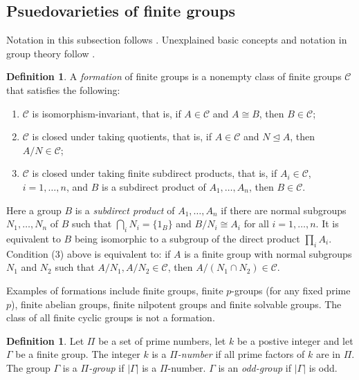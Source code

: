 \documentclass[10pt,a4paper]{amsart}
\theoremstyle{definition}
\newtheorem{definition}[theorem]{Definition}
\theoremstyle{definition}
\numberwithin{equation}{section}
\begin{document}
\subsection{Psuedovarieties of finite groups}
Notation in this subsection follows \cite{RZBook}. Unexplained basic concepts and notation in group theory follow \cite{RobinsonBook}.

\begin{definition}\label{def:formation} A {\em formation} of finite groups is a nonempty class of finite groups $\mathcal{C}$ that satisfies the following:
\begin{enumerate}
\item[(1)] $\mathcal{C}$ is isomorphism-invariant, that is, if $A\in \mathcal{C}$ and $A\cong B$, then $B\in\mathcal{C}$;
\item[(2)] $\mathcal{C}$ is closed under taking quotients, that is, if $A\in\mathcal{C}$ and $N\unlhd A$, then $A/N\in\mathcal{C}$;
\item[(3)] $\mathcal{C}$ is closed under taking finite subdirect products, that is, if $A_i\in \mathcal{C}$, $i=1,\dots, n$, and $B$ is a subdirect product of $A_1,\dots, A_n$, then $B\in \mathcal{C}$.
\end{enumerate}
\end{definition}

Here a group $B$ is a {\em subdirect product} of $A_1, \dots, A_n$ if there are normal subgroups $N_1,\dots, N_n$ of $B$ such that $\bigcap_i N_i=\{1_B\}$ and $B/N_i\cong A_i$ for all $i=1,\dots, n$. It is equivalent to $B$ being isomorphic to a subgroup of the direct product $\prod_i A_i$. Condition (3) above is equivalent to: if $A$ is a finite group with normal subgroups $N_1$ and $N_2$ such that $A/N_1, A/N_2\in\mathcal{C}$, then $A/(N_1\cap N_2)\in\mathcal{C}$. 

Examples of formations include finite groups, finite $p$-groups (for any fixed prime $p$), finite abelian groups, finite nilpotent groups and finite solvable groups. The class of all finite cyclic groups is not a formation. 

\begin{definition} Let $\Pi$ be a set of prime numbers, let $k$ be a postive integer and let $\Gamma$ be a finite group. The integer $k$ is a {\em $\Pi$-number} if all prime factors of $k$ are in $\Pi$. The group $\Gamma$ is a {\em $\Pi$-group} if $|\Gamma|$ is a $\Pi$-number. $\Gamma$ is an {\em odd-group} if $|\Gamma|$ is odd.
\end{definition}
\end{document}
